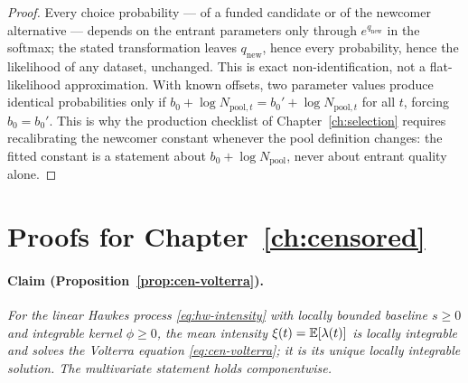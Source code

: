 \begin{proof}
Every choice probability --- of a funded candidate or of the newcomer alternative --- depends on the
entrant parameters only through $e^{q_{\mathrm{new}}}$ in the softmax; the stated transformation
leaves $q_{\mathrm{new}}$, hence every probability, hence the likelihood of any dataset, unchanged.
This is exact non-identification, not a flat-likelihood approximation. With known offsets, two
parameter values produce identical probabilities only if $b_0 + \log N_{\mathrm{pool},t} = b_0' +
\log N_{\mathrm{pool},t}$ for all $t$, forcing $b_0 = b_0'$. This is why the production checklist of
Chapter~\ref{ch:selection} requires recalibrating the newcomer constant whenever the pool definition
changes: the fitted constant is a statement about $b_0 + \log N_{\mathrm{pool}}$, never about
entrant quality alone.
\end{proof}

\section{Proofs for Chapter~\ref{ch:censored}}
\label{app:proofs-ch9}

\paragraph{Claim (Proposition~\ref{prop:cen-volterra}).}
\emph{For the linear Hawkes process \eqref{eq:hw-intensity} with locally bounded baseline $s \ge 0$
and integrable kernel $\phi \ge 0$, the mean intensity $\xi(t) = \mathbb{E}[\lambda(t)]$ is locally
integrable and solves the Volterra equation \eqref{eq:cen-volterra}; it is its unique locally
integrable solution. The multivariate statement holds componentwise.}

